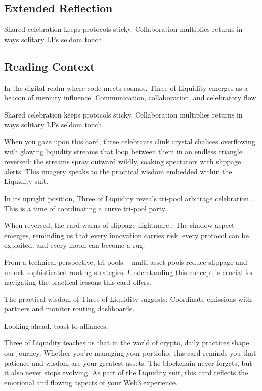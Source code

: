 \documentclass[11pt,oneside]{book}
\begin{document}
\begin{minipage}[t]{0.55\textwidth}
  \subsection*{Extended Reflection}
  Shared celebration keeps protocols sticky. Collaboration multiplies returns in ways solitary LPs seldom touch.

  \subsection*{Reading Context}
  In the digital realm where code meets cosmos, Three of Liquidity emerges as a beacon of mercury influence. Communication, collaboration, and celebratory flow.

  Shared celebration keeps protocols sticky. Collaboration multiplies returns in ways solitary LPs seldom touch.

  When you gaze upon this card, three celebrants clink crystal chalices overflowing with glowing liquidity streams that loop between them in an endless triangle. reversed: the streams spray outward wildly, soaking spectators with slippage alerts. This imagery speaks to the practical wisdom embedded within the Liquidity suit.

  In its upright position, Three of Liquidity reveals tri-pool arbitrage celebration.. This is a time of coordinating a curve tri-pool party..

  When reversed, the card warns of slippage nightmare.. The shadow aspect emerges, reminding us that every innovation carries risk, every protocol can be exploited, and every moon can become a rug.

  From a technical perspective, tri-pools – multi-asset pools reduce slippage and unlock sophisticated routing strategies. Understanding this concept is crucial for navigating the practical lessons this card offers.

  The practical wisdom of Three of Liquidity suggests: Coordinate emissions with partners and monitor routing dashboards.

  Looking ahead, toast to alliances.

  Three of Liquidity teaches us that in the world of crypto, daily practices shape our journey. Whether you're managing your portfolio, this card reminds you that patience and wisdom are your greatest assets. The blockchain never forgets, but it also never stops evolving. As part of the Liquidity suit, this card reflects the emotional and flowing aspects of your Web3 experience.

\end{minipage}
\end{document}
